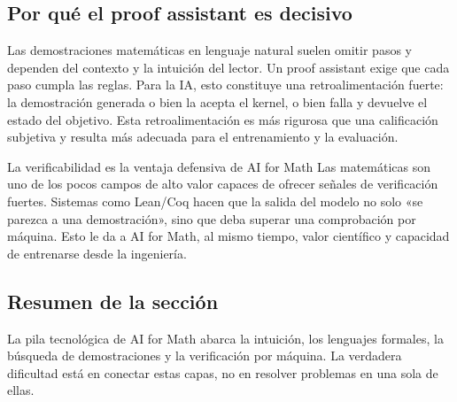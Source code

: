 \subsection{Por qué el proof assistant es decisivo}

Las demostraciones matemáticas en lenguaje natural suelen omitir pasos y dependen del contexto y la intuición del lector. Un proof assistant exige que cada paso cumpla las reglas. Para la IA, esto constituye una retroalimentación fuerte: la demostración generada o bien la acepta el kernel, o bien falla y devuelve el estado del objetivo. Esta retroalimentación es más rigurosa que una calificación subjetiva y resulta más adecuada para el entrenamiento y la evaluación.

\begin{importantbox}{La verificabilidad es la ventaja defensiva de AI for Math}
Las matemáticas son uno de los pocos campos de alto valor capaces de ofrecer señales de verificación fuertes. Sistemas como Lean/Coq hacen que la salida del modelo no solo «se parezca a una demostración», sino que deba superar una comprobación por máquina. Esto le da a AI for Math, al mismo tiempo, valor científico y capacidad de entrenarse desde la ingeniería.
\end{importantbox}

\subsection{Resumen de la sección}

La pila tecnológica de AI for Math abarca la intuición, los lenguajes formales, la búsqueda de demostraciones y la verificación por máquina. La verdadera dificultad está en conectar estas capas, no en resolver problemas en una sola de ellas.
